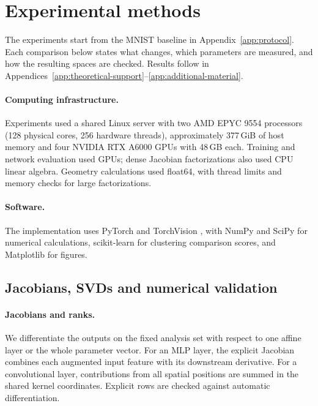\providecommand{\g}[1]{\textcolor{purple}{[#1]}}
\providecommand{\toedit}[1]{\textcolor{teal}{\textbf{[to edit:} #1\textbf{]}}}
\newcommand{\exptable}[1]{{\vspace*{0.5em}\footnotesize\setlength{\tabcolsep}{4pt}\resizebox{\ifdim\width>\linewidth\linewidth\else\width\fi}{!}{}}}

\FloatBarrier
\section{Experimental methods}
\label{app:experiments}
The experiments start from the MNIST baseline in Appendix~\ref{app:protocol}. Each comparison below states what changes, which parameters are measured, and how the resulting spaces are checked. Results follow in Appendices~\ref{app:theoretical-support}--\ref{app:additional-material}.

\paragraph{Computing infrastructure.}\label{app:compute}
Experiments used a shared Linux server with two AMD EPYC 9554 processors (128 physical cores, 256 hardware threads), approximately 377\,GiB of host memory and four NVIDIA RTX A6000 GPUs with 48\,GB each. Training and network evaluation used GPUs; dense Jacobian factorizations also used CPU linear algebra. Geometry calculations used float64, with thread limits and memory checks for large factorizations.

\paragraph{Software.}\label{app:software}
The implementation uses PyTorch \citep{paszke2019pytorch} and TorchVision \citep{torchvision}, with NumPy \citep{harris2020numpy} and SciPy \citep{virtanen2020scipy} for numerical calculations, scikit-learn \citep{pedregosa2011sklearn} for clustering comparison scores, and Matplotlib \citep{hunter2007matplotlib} for figures.

\subsection{Jacobians, SVDs and numerical validation}
\label{app:sanity}
\paragraph{Jacobians and ranks.}
We differentiate the outputs on the fixed analysis set with respect to one affine layer or the whole parameter vector. For an MLP layer, the explicit Jacobian combines each augmented input feature with its downstream derivative. For a convolutional layer, contributions from all spatial positions are summed in the shared kernel coordinates. Explicit rows are checked against automatic differentiation.

